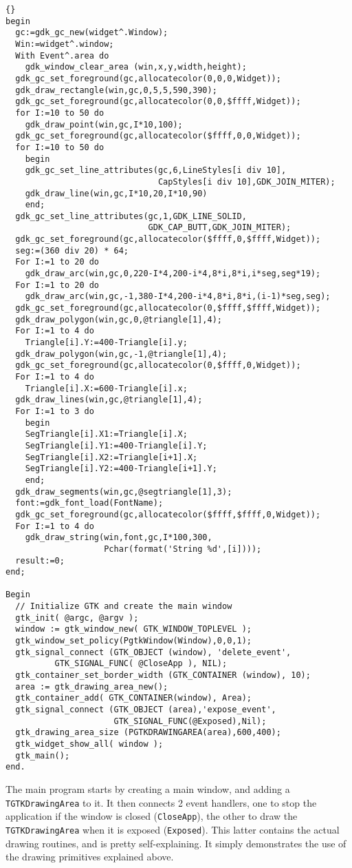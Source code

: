 \documentclass[10pt]{article}
\newcommand{\var}[1]{\texttt{#1}}
\begin{document}
\begin{lstlisting}{}
begin
  gc:=gdk_gc_new(widget^.Window);
  Win:=widget^.window;
  With Event^.area do
    gdk_window_clear_area (win,x,y,width,height);
  gdk_gc_set_foreground(gc,allocatecolor(0,0,0,Widget));
  gdk_draw_rectangle(win,gc,0,5,5,590,390);
  gdk_gc_set_foreground(gc,allocatecolor(0,0,$ffff,Widget));
  for I:=10 to 50 do
    gdk_draw_point(win,gc,I*10,100);
  gdk_gc_set_foreground(gc,allocatecolor($ffff,0,0,Widget));
  for I:=10 to 50 do
    begin
    gdk_gc_set_line_attributes(gc,6,LineStyles[i div 10],
                               CapStyles[i div 10],GDK_JOIN_MITER);
    gdk_draw_line(win,gc,I*10,20,I*10,90)
    end;
  gdk_gc_set_line_attributes(gc,1,GDK_LINE_SOLID,
                             GDK_CAP_BUTT,GDK_JOIN_MITER);
  gdk_gc_set_foreground(gc,allocatecolor($ffff,0,$ffff,Widget));
  seg:=(360 div 20) * 64;
  For I:=1 to 20 do
    gdk_draw_arc(win,gc,0,220-I*4,200-i*4,8*i,8*i,i*seg,seg*19);
  For I:=1 to 20 do
    gdk_draw_arc(win,gc,-1,380-I*4,200-i*4,8*i,8*i,(i-1)*seg,seg);
  gdk_gc_set_foreground(gc,allocatecolor(0,$ffff,$ffff,Widget));
  gdk_draw_polygon(win,gc,0,@triangle[1],4);  
  For I:=1 to 4 do
    Triangle[i].Y:=400-Triangle[i].y;
  gdk_draw_polygon(win,gc,-1,@triangle[1],4);  
  gdk_gc_set_foreground(gc,allocatecolor(0,$ffff,0,Widget));
  For I:=1 to 4 do
    Triangle[i].X:=600-Triangle[i].x;
  gdk_draw_lines(win,gc,@triangle[1],4);
  For I:=1 to 3 do
    begin
    SegTriangle[i].X1:=Triangle[i].X;
    SegTriangle[i].Y1:=400-Triangle[i].Y;
    SegTriangle[i].X2:=Triangle[i+1].X;
    SegTriangle[i].Y2:=400-Triangle[i+1].Y;
    end;
  gdk_draw_segments(win,gc,@segtriangle[1],3);
  font:=gdk_font_load(FontName);
  gdk_gc_set_foreground(gc,allocatecolor($ffff,$ffff,0,Widget));
  For I:=1 to 4 do
    gdk_draw_string(win,font,gc,I*100,300,
                    Pchar(format('String %d',[i])));
  result:=0;
end;

Begin
  // Initialize GTK and create the main window
  gtk_init( @argc, @argv );
  window := gtk_window_new( GTK_WINDOW_TOPLEVEL );
  gtk_window_set_policy(PgtkWindow(Window),0,0,1);
  gtk_signal_connect (GTK_OBJECT (window), 'delete_event',
          GTK_SIGNAL_FUNC( @CloseApp ), NIL);
  gtk_container_set_border_width (GTK_CONTAINER (window), 10);
  area := gtk_drawing_area_new();
  gtk_container_add( GTK_CONTAINER(window), Area);
  gtk_signal_connect (GTK_OBJECT (area),'expose_event',
                      GTK_SIGNAL_FUNC(@Exposed),Nil);
  gtk_drawing_area_size (PGTKDRAWINGAREA(area),600,400);
  gtk_widget_show_all( window ); 
  gtk_main();
end.
\end{lstlisting}
The main program starts by creating a main window,
and adding a \var{TGTKDrawingArea} to it. It then connects 2 event handlers,
one to stop the application if the window is closed (\var{CloseApp}),  
the other to draw the \var{TGTKDrawingArea} when it is exposed 
(\var{Exposed}). This latter contains the actual drawing routines, and is
pretty self-explaining. It simply demonstrates the use of the drawing
primitives explained above.
\end{document}
